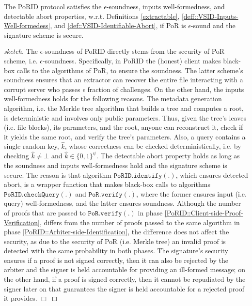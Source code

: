 \begin{theorem}
The PoRID protocol satisfies the $\epsilon$-soundness, inputs well-formedness, and detectable abort properties, w.r.t. Definitions \ref{extractable}, \ref{deff::VSID-Inputs-Well-formedess}, and \ref{def::VSID-Identifiable-Abort}, if PoR is $\epsilon$-sound and the  signature scheme is secure.
\end{theorem}


\begin{proof}[sketch]
The $\epsilon$-soundness of PoRID directly stems from the security of PoR scheme, i.e. $\epsilon$-soundness. Specifically,
in PoRID the (honest) client makes black-box calls to the algorithms of PoR, to ensure the soundness. The latter scheme's soundness ensures that an extractor can recover the entire file interacting with a corrupt server who passes  $\epsilon$ fraction of challenges. On the other hand, the inputs well-formedness holds for the following reasons. The metadata generation algorithm, i.e. the Merkle tree algorithm that builds a tree and computes a root, is deterministic and involves only public  parameters. Thus, given the tree's leaves (i.e. file blocks), its parameters, and the root, anyone can reconstruct it, check if it yields the same root, and verify the tree's parameters. Also, a query contains a single random key, $\hat{k}$, whose correctness can be checked deterministically, i.e. by checking $\hat{k}\neq \bot$ and  $\hat{k}\in \{0,1\}^{\scriptscriptstyle\psi}$. The detectable abort property holds as long as the soundness and inputs well-formedness hold and the signature scheme is secure. The reason is that algorithm $\mathtt{PoRID.identify}(.)$, which ensures detected abort, is a wrapper function that makes black-box calls to algorithms $\mathtt{PoRID.checkQuery}(.)$ and $\mathtt{PoR.verify}(.)$, where the former  ensures input (i.e. query) well-formedness, and the latter  ensures soundness.  Although the number of proofs that are passed to $\mathtt{PoR.verify}(.)$ in phase \ref{PoRID::Client-side-Proof-Verification}, differs from the number of proofs passed to the same algorithm in phase \ref{PoRID::Arbiter-side-Identification}, the difference does not affect the security, as due to the security of PoR (i.e.  Merkle tree) an invalid proof is detected with the same probability in both phases. The signature’s security ensures if a proof is not signed correctly, then it can also be rejected by the arbiter and the signer is held accountable for providing an ill-formed message; on the other hand, if a proof is signed correctly, then it cannot be repudiated by the signer later on that guarantees the signer is held accountable for a rejected proof it provides. 
\hfill\(\Box\)\end{proof}




